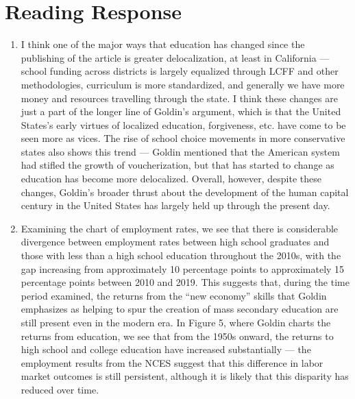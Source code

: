 \documentclass[8pt]{extarticle}
\begin{document}
  \section{Reading Response}%
  \begin{enumerate}[(1)]
    \item I think one of the major ways that education has changed since the publishing of the article is greater delocalization, at least in California --- school funding across districts is largely equalized through LCFF and other methodologies, curriculum is more standardized, and generally we have more money and resources travelling through the state. I think these changes are just a part of the longer line of Goldin's argument, which is that the United States's early virtues of localized education, forgiveness, etc. have come to be seen more as vices. The rise of school choice movements in more conservative states also shows this trend --- Goldin mentioned that the American system had stifled the growth of voucherization, but that has started to change as education has become more delocalized. Overall, however, despite these changes, Goldin's broader thrust about the development of the human capital century in the United States has largely held up through the present day.
    \item Examining the chart of employment rates, we see that there is considerable divergence between employment rates between high school graduates and those with less than a high school education throughout the 2010s, with the gap increasing from approximately 10 percentage points to approximately 15 percentage points between 2010 and 2019. This suggests that, during the time period examined, the returns from the ``new economy'' skills that Goldin emphasizes as helping to spur the creation of mass secondary education are still present even in the modern era. In Figure 5, where Goldin charts the returns from education, we see that from the 1950s onward, the returns to high school and college education have increased substantially --- the employment results from the NCES suggest that this difference in labor market outcomes is still persistent, although it is likely that this disparity has reduced over time.
  \end{enumerate}
\end{document}
